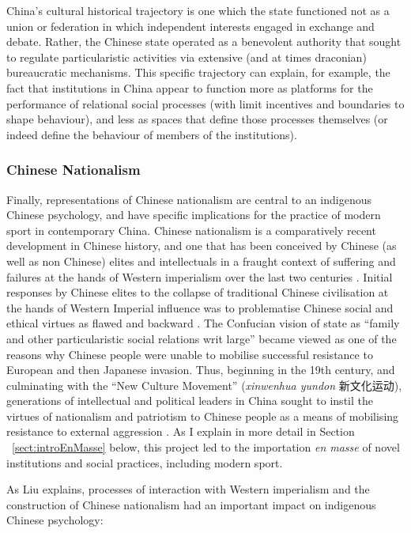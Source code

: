 \begin{CJK}{UTF8}{gbsn}
China's cultural historical trajectory is one which the state functioned not as a union or federation in which independent interests engaged in exchange and debate.  Rather, the Chinese state operated as a benevolent authority that sought to regulate particularistic activities via extensive (and at times draconian) bureaucratic mechanisms.  This specific trajectory can explain, for example, the fact that institutions in China appear to function more as platforms for the performance of relational social processes (with limit incentives and boundaries to shape behaviour), and less as spaces that define those processes themselves (or indeed define the behaviour of members of the institutions).

\subsubsection{Chinese Nationalism}
Finally, representations of Chinese nationalism are central to an indigenous Chinese psychology, and have specific implications for the practice of modern sport in contemporary China.  Chinese nationalism is a comparatively recent development in Chinese history, and one that has been conceived by Chinese (as well as non Chinese) elites and intellectuals in a fraught context of suffering and failures at the hands of Western imperialism over the last two centuries \cite{Liu2009,Liu1995}.  Initial responses by Chinese elites to the collapse of traditional Chinese civilisation at the hands of Western Imperial influence was to problematise Chinese social and ethical virtues as flawed and backward \citep[see][]{Levenson1959}.  The Confucian vision of state as ``family and other particularistic social relations writ large'' became viewed as one of the reasons why Chinese people were unable to mobilise successful resistance to European and then Japanese invasion.  Thus, beginning in the 19th century, and culminating with the ``New Culture Movement'' (\textit{xinwenhua yundon} 新文化运动), generations of intellectual and political leaders in China sought to instil the virtues of nationalism and patriotism to Chinese people as a means of mobilising resistance to external aggression \citep{Pye1996}.  As I explain in more detail in Section ~\ref{sect:introEnMasse} below, this project led to the importation \textit{en masse} of novel institutions and social practices, including modern sport.

As Liu explains, processes of interaction with Western imperialism and the construction of Chinese nationalism had an important impact on indigenous Chinese psychology:


\end{CJK}
